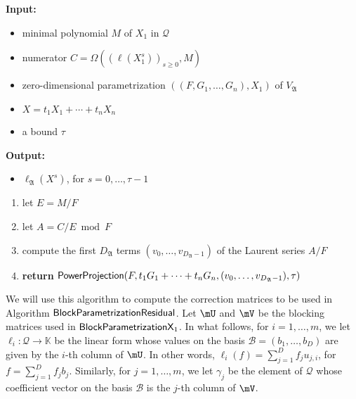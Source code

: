 \documentclass[12pt]{article}
\newcommand{\basis}{\mathscr{B}}
\newcommand{\mainalgoname}{\mathsf{ BlockParametrization}}
\newcommand{\lf}{X}
\newcommand{\residueI}{\mathscr{Q}}
\def\K{\mathbb{K}}
\def\K {\ensuremath{\mathbb{K}}}
\begin{document}
\begin{algorithm}[H]
	\caption{${\sf Decompose}(M, C, ((F,G_1,\dots,G_n),X_1), \lf,\tau)$} {\bf
          Input:} \vspace{-0.5em}
	\begin{itemize}
		\item minimal polynomial $M$ of $X_1$ in $\residueI$
		\item numerator $C=\Omega( (\ell(X_1^s))_{s \ge 0}, M)$
                \item zero-dimensional parametrization $((F,G_1,\dots,G_n),X_1)$ of $V_\mathfrak{A}$
                \item $\lf =t_1 X_1 + \cdots + t_n X_n$
                \item a bound $\tau$
	\end{itemize}
	{\bf Output:}  \vspace{-0.5em}
        \begin{itemize}
        \item $\ell_\mathfrak{A}(\lf^s)$, for $s=0,\dots,\tau-1$
        \end{itemize}
  \begin{enumerate}
  \item let $E=M/F$
  \item let $A=C/E \bmod F$
  \item compute the first $D_\mathfrak{A}$ terms $(v_0,\dots,v_{D_\mathfrak{A}-1})$ of the Laurent series $A/F$
  \item {\bf return} ${\sf PowerProjection}(F, t_1 G_1 + \cdots + t_n G_n, (v_0,\dots,v_{D_\mathfrak{A}-1}),\tau)$
  \end{enumerate}
\end{algorithm}

We will use this algorithm to compute the correction matrices to be
used in Algorithm $\mainalgoname{\sf Residual}$. Let $\mU$ and $\mV$
be the blocking matrices used in $\mainalgoname{\sf X}_1$. In what
follows, for $i=1,\dots,m$, we let $\ell_i: \residueI \to \K$ be the
linear form whose values on the basis $\basis=(b_1,\dots,b_D)$ are
given by the $i$-th column of $\mU$. In other words, $\ell_i(f) =
\sum_{j=1}^D f_j u_{j,i}$, for $f=\sum_{j=1}^D f_j b_j$. Similarly,
for $j=1,\dots,m$, we let $\gamma_j$ be the element of $\residueI$
whose coefficient vector on the basis $\basis$ is the $j$-th column of
$\mV$.
\end{document}
